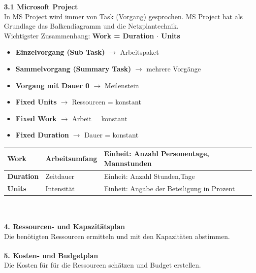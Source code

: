 \textbf{3.1 Microsoft Project}\\
In MS Project wird immer von Task (Vorgang) gesprochen.\newline
MS Project hat als Grundlage das Balkendiagramm und die Netzplantechnik.\\
Wichtigster Zusammenhang: \textbf{Work = Duration $\cdot$ Units}\\
\begin{multicols}{2}
	\begin{itemize}
		\item \textbf{Einzelvorgang (Sub Task)} $\rightarrow$ Arbeitspaket
		\item \textbf{Sammelvorgang (Summary Task)} \newline $\rightarrow$ mehrere Vorgänge
		\item \textbf{Vorgang mit Dauer 0} $\rightarrow$ Meilenstein	
	\end{itemize}
	\begin{itemize}
		\item \textbf{Fixed Units} $\rightarrow$ Ressourcen = konstant
		\item \textbf{Fixed Work} $\rightarrow$ Arbeit = konstant
		\item \textbf{Fixed Duration} $\rightarrow$ Dauer = konstant
	\end{itemize}
\end{multicols}

\begin{tabular}{|l|l|l|}
	\hline \textbf{Work}& Arbeitsumfang & Einheit: Anzahl Personentage, Mannstunden\\
	\hline \textbf{Duration} & Zeitdauer & Einheit: Anzahl Stunden,Tage\\
	\hline \textbf{Units}& Intensität& Einheit: Angabe der Beteiligung in Prozent\\
	\hline
\end{tabular}\\\\
\textbf{4. Ressourcen- und Kapazitätsplan}\\
Die benötigten Ressourcen ermitteln und mit den Kapazitäten abstimmen. 
\\
\\
\textbf{5. Kosten- und Budgetplan}\\
Die Kosten für für die Ressourcen schätzen und Budget erstellen. 

